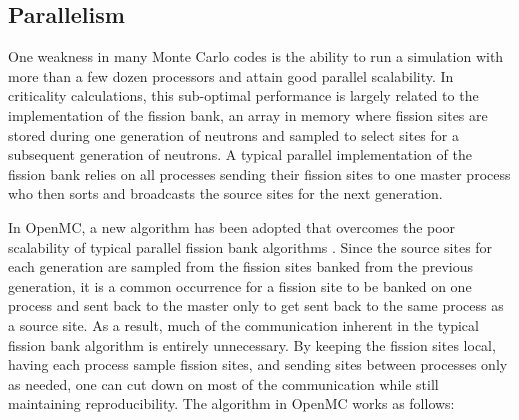 \documentclass[authoryear,preprint]{elsarticle}
\begin{document}
\subsection{Parallelism}
\label{sec:parallelism}

One weakness in many Monte Carlo codes is the ability to run a simulation with
more than a few dozen processors and attain good parallel scalability. In
criticality calculations, this sub-optimal performance is largely related to the
implementation of the fission bank, an array in memory where fission sites are
stored during one generation of neutrons and sampled to select sites for a
subsequent generation of neutrons. A typical parallel implementation of the
fission bank relies on all processes sending their fission sites to one master
process who then sorts and broadcasts the source sites for the next generation.

In OpenMC, a new algorithm has been adopted that overcomes the poor scalability
of typical parallel fission bank algorithms \citep{fissionbank}. Since the
source sites for each generation are sampled from the fission sites banked from
the previous generation, it is a common occurrence for a fission site to be
banked on one process and sent back to the master only to get sent back to the
same process as a source site. As a result, much of the communication inherent
in the typical fission bank algorithm is entirely unnecessary. By keeping the
fission sites local, having each process sample fission sites, and sending sites
between processes only as needed, one can cut down on most of the communication
while still maintaining reproducibility. The algorithm in OpenMC works as
follows:
\end{document}
